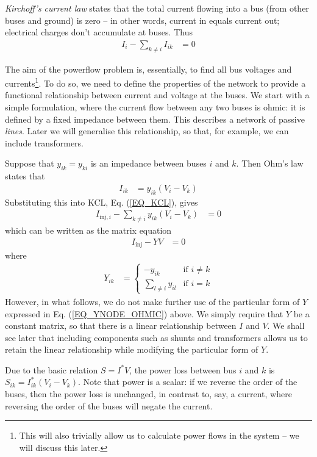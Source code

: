 \documentclass[11pt]{article}
\begin{document}
\emph{Kirchoff's current law} states that the total current flowing into a bus (from other buses and ground) is zero -- in other words, current in equals current out; electrical charges don't accumulate at buses. Thus
\begin{align}
	I_{i} - \sum_{k \ne i}{I_{ik}} &= 0
	\label{EQ_KCL}
\end{align}

The aim of the powerflow problem is, essentially, to find all bus voltages and currents\footnote{This will also trivially allow us to calculate power flows in the system -- we will discuss this later.}. To do so, we need to define the properties of the network to provide a functional relationship between current and voltage at the buses. We start with a simple formulation, where the current flow between any two buses is ohmic: it is defined by a fixed impedance between them. This describes a network of passive \emph{lines}. Later we will generalise this relationship, so that, for example, we can include transformers.

Suppose that $y_{ik} = y_{ki}$ is an impedance between buses $i$ and $k$. Then Ohm's law states that
\begin{align}
	I_{ik} &= y_{ik}(V_i - V_k)
\end{align}
Substituting this into KCL, Eq. (\ref{EQ_KCL}), gives
\begin{align}
	I_{\text{inj},i} - \sum_{k \ne i}{y_{ik}(V_i - V_k)} &= 0
	\label{EQ_PF_1}
\end{align}
which can be written as the matrix equation
\begin{align}
	I_\text{inj} - YV &= 0
\end{align}
where
\begin{align}
	Y_{ik} &=
		\begin{cases}
			-y_{ik}&\text{if $i \ne k$} \\
			\sum_{l \ne i} y_{il}& \text{if $i = k$}
		\end{cases}
	\label{EQ_YNODE_OHMIC}
\end{align}
However, in what follows, we do not make further use of the particular form of $Y$ expressed in Eq. (\ref{EQ_YNODE_OHMIC}) above. We simply require that $Y$ be a constant matrix, so that there is a linear relationship between $I$ and $V$. We shall see later that including components such as shunts and transformers allows us to retain the linear relationship while modifying the particular form of $Y$.

Due to the basic relation $S = I^*V$, the power loss between bus $i$ and $k$ is $S_{ik} = I_{ik}^*(V_i - V_k)$. Note that power is a scalar: if we reverse the order of the buses, then the power loss is unchanged, in contrast to, say, a current, where reversing the order of the buses will negate the current.
\end{document}
